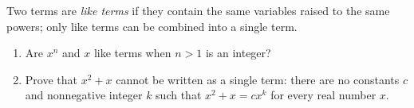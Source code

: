 Two terms are \emph{like terms} if they contain the same variables raised to the same powers; only like terms can be combined into a single term.
\begin{enumerate}
\item[(a)] Are $x^n$ and $x$ like terms when $n>1$ is an integer?
\item[(b)] Prove that $x^2+x$ cannot be written as a single term: there are no constants $c$ and nonnegative integer $k$ such that $x^2+x=cx^k$ for every real number $x$.
\end{enumerate}
